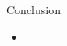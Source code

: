 \documentclass{beamer}
\begin{document}











\begin{frame}{Conclusion}
	\begin{itemize}
		\item 
	\end{itemize}
\end{frame}
\end{document}
